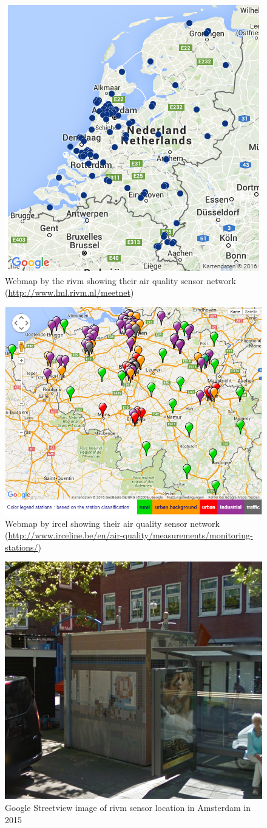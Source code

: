 \begin{figure}
	\centering
	\includegraphics[width=0.6\linewidth]{figs/RIVMSensors.png}
	\caption{Webmap by the \ac{rivm} showing their air quality sensor network (\url{http://www.lml.rivm.nl/meetnet})}
	\label{fig:RIVMSensor}
\end{figure}

\begin{figure}
	\centering
	\includegraphics[width=0.6\linewidth]{figs/IRCELINESensors.png}
	\caption{Webmap by \ac{ircel} showing their air quality sensor network (\url{http://www.irceline.be/en/air-quality/measurements/monitoring-stations/})}
	\label{fig:IRCELINESensor}
\end{figure}

\begin{figure}
	\centering
	\includegraphics[width=1\linewidth]{figs/SensorAdam.png}
	\caption{Google Streetview image of \ac{rivm} sensor location in Amsterdam in 2015}
	\label{fig:Sensor}
\end{figure}
